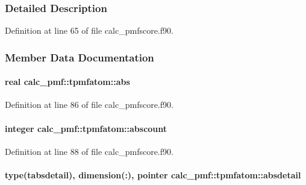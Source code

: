 \subsubsection{Detailed Description}


Definition at line 65 of file calc\-\_\-pmfscore.\-f90.



\subsubsection{Member Data Documentation}
\hypertarget{structcalc__pmf_1_1tpmfatom_a7034f363b669e7743e2bb97283c01798}{
\paragraph[{abs}]{\setlength{\rightskip}{0pt plus 5cm}real calc\-\_\-pmf\-::tpmfatom\-::abs}}\label{structcalc__pmf_1_1tpmfatom_a7034f363b669e7743e2bb97283c01798}


Definition at line 86 of file calc\-\_\-pmfscore.\-f90.

\hypertarget{structcalc__pmf_1_1tpmfatom_a4c2c28155882e14eec01d95ee508d283}{
\paragraph[{abscount}]{\setlength{\rightskip}{0pt plus 5cm}integer calc\-\_\-pmf\-::tpmfatom\-::abscount}}\label{structcalc__pmf_1_1tpmfatom_a4c2c28155882e14eec01d95ee508d283}


Definition at line 88 of file calc\-\_\-pmfscore.\-f90.

\hypertarget{structcalc__pmf_1_1tpmfatom_a65f3001e133e4e49fda5b8dcfc9a1ad5}{
\paragraph[{absdetail}]{\setlength{\rightskip}{0pt plus 5cm}type({\bf tabsdetail}), dimension(\-:), pointer calc\-\_\-pmf\-::tpmfatom\-::absdetail}}\label{structcalc__pmf_1_1tpmfatom_a65f3001e133e4e49fda5b8dcfc9a1ad5}


